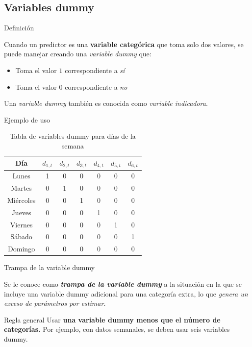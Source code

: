 \documentclass[11pt]{beamer}
\begin{document}
\subsection{Variables dummy}
\begin{frame}{Definición}
	\begin{block}{}
		Cuando un predictor es una \textbf{variable categórica} que toma solo dos valores, se puede manejar creando una \textit{variable dummy} que:
		\begin{itemize}
			\item Toma el valor $1$ correspondiente a \textit{sí}
			\item Toma el valor $0$ correspondiente a \textit{no}
		\end{itemize}				
		Una \textit{variable dummy} también es conocida como \textit{variable indicadora}.
	\end{block}
\end{frame}

\begin{frame}{Ejemplo de uso}
	\begin{block}{}
	\begin{table}[h!]
		\centering
		\begin{tabular}{|c|c|c|c|c|c|c|}
			\hline
			Día & $d_{1,t}$ & $d_{2,t}$ & $d_{3,t}$ & $d_{4,t}$ & $d_{5,t}$ & $d_{6,t}$ \\
			\hline
			Lunes & 1 & 0 & 0 & 0 & 0 & 0 \\
			Martes & 0 & 1 & 0 & 0 & 0 & 0 \\
			Miércoles & 0 & 0 & 1 & 0 & 0 & 0 \\
			Jueves & 0 & 0 & 0 & 1 & 0 & 0 \\
			Viernes & 0 & 0 & 0 & 0 & 1 & 0 \\
			Sábado & 0 & 0 & 0 & 0 & 0 & 1 \\
			Domingo & 0 & 0 & 0 & 0 & 0 & 0 \\
			\hline
		\end{tabular}
		\caption{Tabla de variables dummy para días de la semana}
	\end{table}
	\end{block}
\end{frame}

\begin{frame}{Trampa de la variable dummy}
	\begin{block}{}
		Se le conoce como \textbf{\textit{trampa de la variable dummy}} a la situación en la que se incluye una variable dummy adicional para una categoría extra, lo que \textit{genera un exceso de parámetros por estimar. }
	\end{block}
	
	\begin{block}{Regla general}
		Usar \textbf{una variable dummy menos que el número de categorías.} Por ejemplo, con datos semanales, se deben usar seis variables dummy.
	\end{block}
\end{frame}
\end{document}
